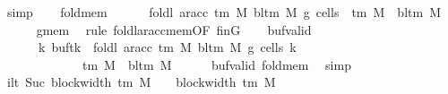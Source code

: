 \begin{isabellebody}
\ simp\isanewline
\ \ \isamarkupfalse%
\ fold{}{\isacharunderscore}{\kern0pt}mem{\isacharcolon}{\kern0pt}\isanewline
\ \ \ \ \ \ {\isachardoublequoteopen}foldl\ {\isacharparenleft}{\kern0pt}ar{\isacharunderscore}{\kern0pt}acc\ {\isacharparenleft}{\kern0pt}{\isasymGamma}{\isacharunderscore}{\kern0pt}tm\ M{\isacharparenright}{\kern0pt}\ {\isacharparenleft}{\kern0pt}bl{\isacharunderscore}{\kern0pt}tm\ M{\isacharparenright}{\kern0pt}{\isacharparenright}{\kern0pt}\ {\isacharquery}{\kern0pt}g{}\ {\isacharquery}{\kern0pt}cells{}\ {\isasymin}\ {\isasymGamma}{\isacharunderscore}{\kern0pt}tm\ M\ {\isasymunion}\ {\isacharbraceleft}{\kern0pt}bl{\isacharunderscore}{\kern0pt}tm\ M{\isacharbraceright}{\kern0pt}{\isachardoublequoteclose}\isanewline
\ \ \ \ \isamarkupfalse%
\ g{}{\isacharunderscore}{\kern0pt}mem\ \isamarkupfalse%
\ {\isacharparenleft}{\kern0pt}rule\ foldl{\isacharunderscore}{\kern0pt}ar{\isacharunderscore}{\kern0pt}acc{\isacharunderscore}{\kern0pt}mem{\isacharbrackleft}{\kern0pt}OF\ finG{\isacharbrackright}{\kern0pt}{\isacharparenright}{\kern0pt}\isanewline
\ \ \isamarkupfalse%
\ buf{}{\isacharunderscore}{\kern0pt}valid{\isacharcolon}{\kern0pt}\isanewline
\ \ \ \ \ \ {\isachardoublequoteopen}{\isasymforall}k{\isachardot}{\kern0pt}\ {\isacharparenleft}{\kern0pt}buf{\isacharparenleft}{\kern0pt}tk\ {\isacharcolon}{\kern0pt}{\isacharequal}{\kern0pt}\ foldl\ {\isacharparenleft}{\kern0pt}ar{\isacharunderscore}{\kern0pt}acc\ {\isacharparenleft}{\kern0pt}{\isasymGamma}{\isacharunderscore}{\kern0pt}tm\ M{\isacharparenright}{\kern0pt}\ {\isacharparenleft}{\kern0pt}bl{\isacharunderscore}{\kern0pt}tm\ M{\isacharparenright}{\kern0pt}{\isacharparenright}{\kern0pt}\ {\isacharquery}{\kern0pt}g{}\ {\isacharquery}{\kern0pt}cells{}{\isacharparenright}{\kern0pt}{\isacharparenright}{\kern0pt}\ k\isanewline
\ \ \ \ \ \ \ \ \ \ \ \ {\isasymin}\ {\isasymGamma}{\isacharunderscore}{\kern0pt}tm\ M\ {\isasymunion}\ {\isacharbraceleft}{\kern0pt}bl{\isacharunderscore}{\kern0pt}tm\ M{\isacharbraceright}{\kern0pt}{\isachardoublequoteclose}\isanewline
\ \ \ \ \isamarkupfalse%
\ buf{\isacharunderscore}{\kern0pt}valid\ fold{}{\isacharunderscore}{\kern0pt}mem\ \isamarkupfalse%
\ simp\isanewline
\ \ \isamarkupfalse%
\ ilt{\isacharcolon}{\kern0pt}\ {\isachardoublequoteopen}Suc\ {\isacharparenleft}{\kern0pt}block{\isacharunderscore}{\kern0pt}width\ {\isacharparenleft}{\kern0pt}{\isasymGamma}{\isacharunderscore}{\kern0pt}tm\ M{\isacharparenright}{\kern0pt}{\isacharparenright}{\kern0pt}\ {\isacharless}{\kern0pt}\ {}\ {\isacharasterisk}{\kern0pt}\ block{\isacharunderscore}{\kern0pt}width\ {\isacharparenleft}{\kern0pt}{\isasymGamma}{\isacharunderscore}{\kern0pt}tm\ M{\isacharparenright}{\kern0pt}{\isachardoublequoteclose}\ \isamarkupfalse%

\end{isabellebody}
